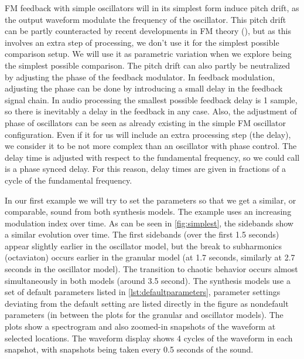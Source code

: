 \documentclass[runningheads,a4paper]{llncs}
\begin{document}
FM feedback with simple oscillators will in its simplest form induce pitch drift, as the output waveform modulate the frequency of the oscillator. This pitch drift can be partly counteracted by recent developments in FM theory (\cite{Lazzarini-2024}), but as this involves an extra step of processing, we don't use it for the simplest possible comparison setup. We will use it as parametric variation when we explore being the simplest possible comparison. The pitch drift can also partly be neutralized by adjusting the phase of the feedback modulator. In feedback modulation, adjusting the phase can be done by introducing a small delay in the feedback signal chain. In audio processing the smallest possible feedback delay is 1 sample, so there is inevitably a delay in the feedback in any case. Also, the adjustment of phase of oscillators can be seen as already existing in the simple FM oscillator configuration. Even if it for us will include an extra processing step (the delay), we consider it to be not more complex than an oscillator with phase control. The delay time is adjusted with respect to the fundamental frequency, so we could call is a phase synced delay. For this reason, delay times are given in fractions of a cycle of the fundamental frequency. 

In our first example we will try to set the parameters so that we get a similar, or comparable, sound from both synthesis models. The example uses an increasing modulation index over time. As can be seen in \ref{fig:simplest}, the sidebands show a similar evolution over time. The first sidebands (over the first 1.5 seconds) appear slightly earlier in the oscillator model, but the break to subharmonics (octaviaton) occurs earlier in the granular model (at 1.7 seconds, similarly at 2.7 seconds in the oscillator model). The transition to chaotic behavior occurs almost simultaneously in both models (around 3.5 second). The synthesis models use a set of default parameters listed in \ref{lst:defaultparameters}, parameter settings deviating from the default setting are listed directly in the figure as nondefault parameters (in between the plots for the granular and oscillator models). The plots show a spectrogram and also zoomed-in snapshots of the waveform at selected locations. The waveform display shows 4 cycles of the waveform in each snapshot, with snapshots being taken every 0.5 seconds of the sound.
\end{document}
